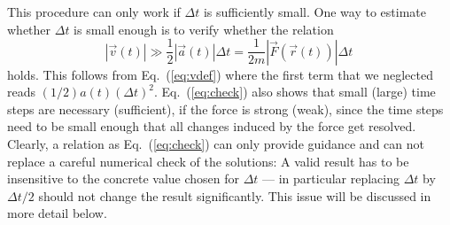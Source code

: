 \documentclass[12pt,ngerman,american]{iopart}
\begin{document}
This procedure can only work if $\Delta t$ is sufficiently small.
One way to estimate whether $\Delta t$ is small enough is to verify whether the relation
\begin{equation}
|\vec v(t)| \gg \frac12|\vec a(t)|\Delta t = \frac{1}{2m} |\vec F(\vec r(t)) |\Delta t\
\label{eq:check}
\end{equation}
holds. This follows from Eq.~(\ref{eq:vdef}) where the first term that we neglected reads $(1/2)a(t){(\Delta t)}^2$.
Eq.~({\ref{eq:check}}) also shows that small (large) time steps are necessary (sufficient), if the force is strong (weak), since the time steps need to be small enough that all changes induced by the force get resolved.
Clearly, a relation as Eq.~({\ref{eq:check}}) can only provide guidance and can not replace a careful numerical check of the solutions: A valid result has to be insensitive to the concrete value chosen for $\Delta t$ --- in particular replacing $\Delta t$ by $\Delta t/2$ should not change the result significantly.
This issue will be discussed in more detail below.



\end{document}
